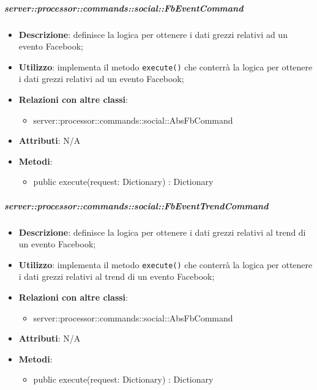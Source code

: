         \subparagraph{server::processor::commands::social::FbEventCommand} %
        \label{subp:bdsm_app_server_processor_commands_social_fbeventcommand}
        \begin{itemize}
          \item \textbf{Descrizione}: definisce la logica per ottenere i dati grezzi relativi ad un evento Facebook;
          \item \textbf{Utilizzo}: implementa il metodo \texttt{execute()} che conterrà la logica per ottenere i dati grezzi relativi ad un evento Facebook;
          \item \textbf{Relazioni con altre classi}:
            \begin{itemize}
              \item server::processor::commands::social::AbsFbCommand
            \end{itemize}
            \item \textbf{Attributi}: N/A
			\item \textbf{Metodi}:
        	\begin{itemize}
          		\item public execute(request: Dictionary) : Dictionary
        	\end{itemize}
        \end{itemize}

        \subparagraph{server::processor::commands::social::FbEventTrendCommand} %
        \label{subp:bdsm_app_server_processor_commands_social_fbeventtrendcommand}
        \begin{itemize}
          \item \textbf{Descrizione}: definisce la logica per ottenere i dati grezzi relativi al trend di un evento Facebook;
          \item \textbf{Utilizzo}: implementa il metodo \texttt{execute()} che conterrà la logica per ottenere i dati grezzi relativi al trend di un evento Facebook;
          \item \textbf{Relazioni con altre classi}:
            \begin{itemize}
              \item server::processor::commands::social::AbsFbCommand
            \end{itemize}
            \item \textbf{Attributi}: N/A
			\item \textbf{Metodi}:
        	\begin{itemize}
          		\item public execute(request: Dictionary) : Dictionary
        	\end{itemize}
        \end{itemize}

